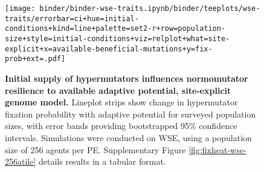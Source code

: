 \begin{figure}[h]
\begin{minipage}{0.6\textwidth}
  \texttt{[image: binder/binder-wse-traits.ipynb/binder/teeplots/wse-traits/errorbar=ci+hue=initial-conditions+kind=line+palette=set2-r+row=population-size+style=initial-conditions+viz=relplot+what=site-explicit+x=available-beneficial-mutations+y=fix-prob+ext=.pdf]}%
\end{minipage}%
\begin{minipage}{0.4\textwidth}
  \caption{
  \textbf{Initial supply of hypermutators influences normomutator resilience to available adaptive potential, site-explicit genome model.}
  \footnotesize
  Lineplot strips show change in hypermutator fixation probability with adaptive potential for surveyed population sizes, with error bands providing bootstrapped 95\% confidence intervals.
  Simulations were conducted on WSE, using a population size of 256 agents per PE.
  Supplementary Figure \ref{fig:fixheat-wse-256atile} details results in a tabular format.
    }
    \label{fig:denovo-5050-conditions-combined-site-explicit}
  \end{minipage}
\end{figure}

